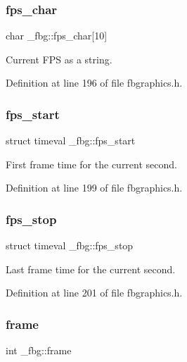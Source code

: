 \subsubsection{\texorpdfstring{fps\+\_\+char}{fps\_char}}
{\footnotesize\ttfamily char \+\_\+fbg\+::fps\+\_\+char\mbox{[}10\mbox{]}}



Current F\+PS as a string. 



Definition at line 196 of file fbgraphics.\+h.

\mbox{\label{struct__fbg_a07d7bb827a7595c956fe22c2d65bba33}} 
\subsubsection{\texorpdfstring{fps\+\_\+start}{fps\_start}}
{\footnotesize\ttfamily struct timeval \+\_\+fbg\+::fps\+\_\+start}



First frame time for the current second. 



Definition at line 199 of file fbgraphics.\+h.

\mbox{\label{struct__fbg_ade17a45bbc82bef326857c2837cdf66c}} 
\subsubsection{\texorpdfstring{fps\+\_\+stop}{fps\_stop}}
{\footnotesize\ttfamily struct timeval \+\_\+fbg\+::fps\+\_\+stop}



Last frame time for the current second. 



Definition at line 201 of file fbgraphics.\+h.

\mbox{\label{struct__fbg_aa3ef83f919d12e680f8c64006b441454}} 
\subsubsection{\texorpdfstring{frame}{frame}}
{\footnotesize\ttfamily int \+\_\+fbg\+::frame}



